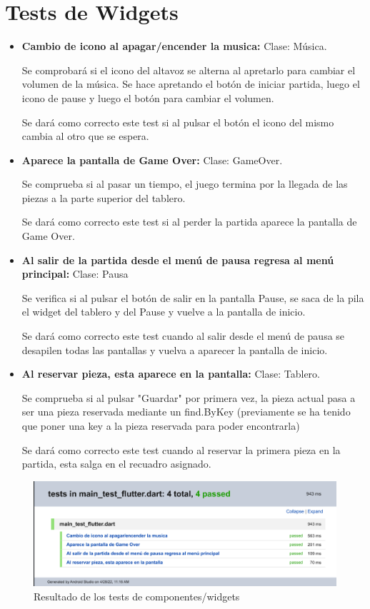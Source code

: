 \documentclass{article}
\begin{document}
\newpage

\section{Tests de Widgets}
\begin{itemize}
\item \textbf{Cambio de icono al apagar/encender la musica:} Clase: Música.

Se comprobará si el icono del altavoz se alterna al apretarlo para cambiar el volumen de la música.
Se hace apretando el botón de iniciar partida, luego el icono de pause y luego el botón para cambiar el volumen.

Se dará como correcto este test si al pulsar el botón el icono del mismo cambia al otro que se espera.

\item \textbf{Aparece la pantalla de Game Over:} Clase: GameOver.

Se comprueba si al pasar un tiempo, el juego termina por la llegada de las piezas a la parte
superior del tablero.

Se dará como correcto este test si al perder la partida aparece la pantalla de Game Over.

\item \textbf{Al salir de la partida desde el menú de pausa regresa al menú principal:} Clase: Pausa

Se verifica si al pulsar el botón de salir en la pantalla Pause, se saca de la pila el widget del tablero y del Pause y vuelve a la pantalla de inicio.

Se dará como correcto este test cuando al salir desde el menú de pausa se desapilen todas las pantallas y vuelva a aparecer la pantalla de inicio.

\item \textbf{Al reservar pieza, esta aparece en la pantalla: }Clase: Tablero.

Se comprueba si al pulsar "Guardar" por primera vez, la pieza actual pasa a ser una pieza reservada mediante
un find.ByKey (previamente se ha tenido que poner una key a la pieza reservada para poder
encontrarla)

Se dará como correcto este test cuando al reservar la primera pieza en la partida, esta salga en el recuadro asignado.

\end{itemize}

\begin{figure}[H]
      \includegraphics[width=\textwidth]{imagenes/flutter_test.png}
      \caption{Resultado de los tests de componentes/widgets}
\end{figure}
\end{document}
